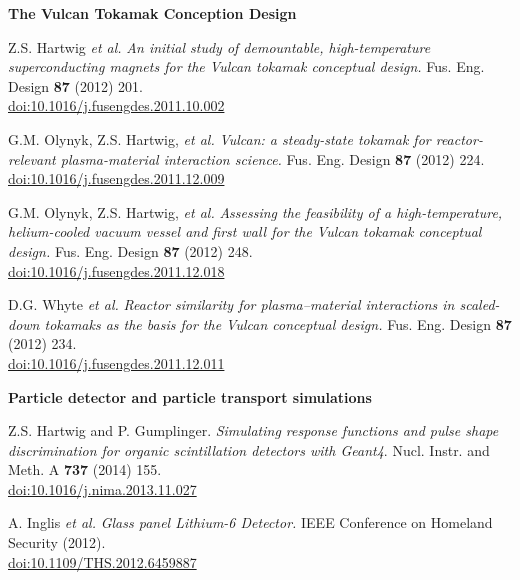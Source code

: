 \documentclass[10pt]{article}
\begin{document}
\vspace{0.5cm}

\textbf{The Vulcan Tokamak Conception Design}
\begin{innerlist}
\item Z.S. Hartwig \textit{et al.} \textit{An initial study of
  demountable, high-temperature superconducting magnets for the Vulcan
  tokamak conceptual design.} Fus. Eng. Design \textbf{87} (2012) 201.\\
  \href{http://dx.doi.org/10.1016/j.fusengdes.2011.10.002}{doi:10.1016/j.fusengdes.2011.10.002}
  \vspace{0.2cm}

\item G.M. Olynyk, Z.S. Hartwig, \textit{et al.} \textit{Vulcan: a
  steady-state tokamak for reactor-relevant plasma-material
  interaction science.} Fus. Eng. Design \textbf{87} (2012) 224.\\
  \href{http://dx.doi.org/10.1016/j.fusengdes.2011.12.009}{doi:10.1016/j.fusengdes.2011.12.009}
  \vspace{0.2cm}

\item G.M. Olynyk, Z.S. Hartwig, \textit{et al.} \textit{Assessing the
  feasibility of a high-temperature, helium-cooled vacuum vessel and
  first wall for the Vulcan tokamak conceptual design.} Fus. Eng. Design \textbf{87} (2012) 248.\\
  \href{http://dx.doi.org/10.1016/j.fusengdes.2011.12.018}{doi:10.1016/j.fusengdes.2011.12.018}
  \vspace{0.2cm}

\item D.G. Whyte \textit{et al.} \textit{Reactor similarity for
  plasma--material interactions in scaled-down tokamaks as the basis
  for the Vulcan conceptual design.} Fus. Eng. Design \textbf{87} (2012) 234.\\
  \href{http://dx.doi.org/10.1016/j.fusengdes.2011.12.011}{doi:10.1016/j.fusengdes.2011.12.011}
\end{innerlist}

\vspace{0.5cm}

\textbf{Particle detector and particle transport simulations}
\begin{innerlist}
\item Z.S. Hartwig and P. Gumplinger. \textit{Simulating response functions
  and pulse shape discrimination for organic scintillation detectors
  with Geant4}. Nucl. Instr. and Meth. A \textbf{737} (2014) 155.\\
  \href{http://dx.doi.org/10.1016/j.nima.2013.11.027}{doi:10.1016/j.nima.2013.11.027}
  \vspace{0.2cm}

\item A. Inglis \textit{et al.} \textit{Glass panel Lithium-6 Detector.}
IEEE Conference on Homeland Security (2012).\\
\href{http://dx.doi.org/10.1109/THS.2012.6459887}{doi:10.1109/THS.2012.6459887}
\end{innerlist}
\end{document}
